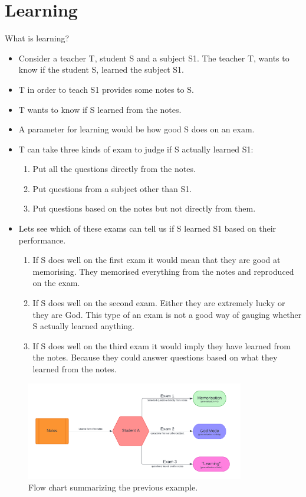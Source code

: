 \documentclass[11pt,notheorems,hyperref={pdfauthor=whatever}]{beamer}
\begin{document}
\section{Learning}
\begin{frame}[allowframebreaks]{What is learning?}
\begin{itemize}
    \item Consider a \alert{teacher T}, \alert{student S} and a \alert{subject S1}. The teacher T, wants to know if the student S, learned the subject S1.
    \item \alert{T} in order to teach \alert{S1} provides some \alert{notes} to \alert{S}.
    \item \alert{T} wants to know if \alert{S} learned from the notes.
    \item A parameter for learning would be how good \alert{S} does on an exam.
    \item \alert{T} can take three kinds of exam to judge if \alert{S} actually learned \alert{S1}:
    \begin{enumerate}
        \item Put all the questions directly from the notes.
        \item Put questions from a subject other than \alert{S1}.
        \item Put questions based on the notes but not directly from them. 
    \end{enumerate}
    \bigskip
    \item Lets see which of these exams can tell us if \alert{S} learned \alert{S1} based on their performance.
    \begin{enumerate}
        \item If \alert{S} does well on the first exam it would mean that they are good at memorising. They memorised everything from the notes and reproduced on the exam. 
        \item If \alert{S} does well on the second exam. Either they are extremely lucky or they are God. This type of an exam is not a good way of gauging whether \alert{S} actually learned anything.
        \item If \alert{S} does well on the third exam it would imply they have learned from the notes. Because they could answer questions based on what they learned from the notes. 
    \end{enumerate}
\end{itemize}
\begin{figure}
    \centering
    \includegraphics[width=0.85\textwidth]{figures/Generelisation.png}
    \caption{Flow chart summarizing the previous example.}
    \label{fig:Generalisation}
\end{figure}
\end{frame}
\end{document}
